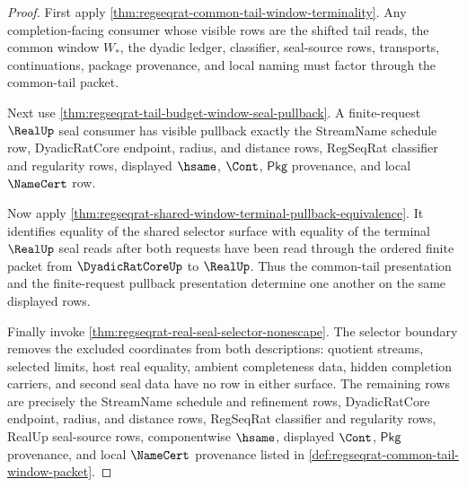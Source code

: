 \begin{proof}
First apply \autoref{thm:regseqrat-common-tail-window-terminality}. Any completion-facing consumer whose visible rows are the shifted tail reads, the common window $W_\ast$, the dyadic ledger, classifier, seal-source rows, transports, continuations, package provenance, and local naming must factor through the common-tail packet.

Next use \autoref{thm:regseqrat-tail-budget-window-seal-pullback}. A finite-request $\RealUp$ seal consumer has visible pullback exactly the StreamName schedule row, DyadicRatCore endpoint, radius, and distance rows, RegSeqRat classifier and regularity rows, displayed $\hsame$, $\Cont$, $\mathsf{Pkg}$ provenance, and local $\NameCert$ row.

Now apply \autoref{thm:regseqrat-shared-window-terminal-pullback-equivalence}. It identifies equality of the shared selector surface with equality of the terminal $\RealUp$ seal reads after both requests have been read through the ordered finite packet from $\DyadicRatCoreUp$ to $\RealUp$. Thus the common-tail presentation and the finite-request pullback presentation determine one another on the same displayed rows.

Finally invoke \autoref{thm:regseqrat-real-seal-selector-nonescape}. The selector boundary removes the excluded coordinates from both descriptions: quotient streams, selected limits, host real equality, ambient completeness data, hidden completion carriers, and second seal data have no row in either surface. The remaining rows are precisely the StreamName schedule and refinement rows, DyadicRatCore endpoint, radius, and distance rows, RegSeqRat classifier and regularity rows, RealUp seal-source rows, componentwise $\hsame$, displayed $\Cont$, $\mathsf{Pkg}$ provenance, and local $\NameCert$ provenance listed in \autoref{def:regseqrat-common-tail-window-packet}.
\end{proof}

